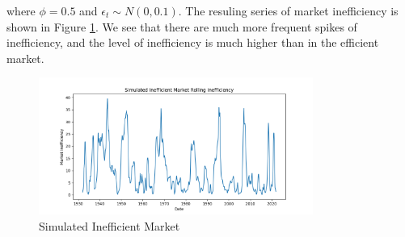 where $\phi = 0.5$ and $\epsilon_t \sim N(0, 0.1)$. The resuling series of market inefficiency
 is shown in Figure \ref{fig:inefficient_market}. We see that there are much more frequent spikes of inefficiency, and the level of inefficiency is much higher than in the efficient market.

\begin{figure}[h]
    \centering
    \includegraphics[width=0.8\textwidth]{../figs/Simulated Inefficient Market Rolling Inefficiency.png}
    \caption{Simulated Inefficient Market}
    \label{fig:inefficient_market}
\end{figure}
